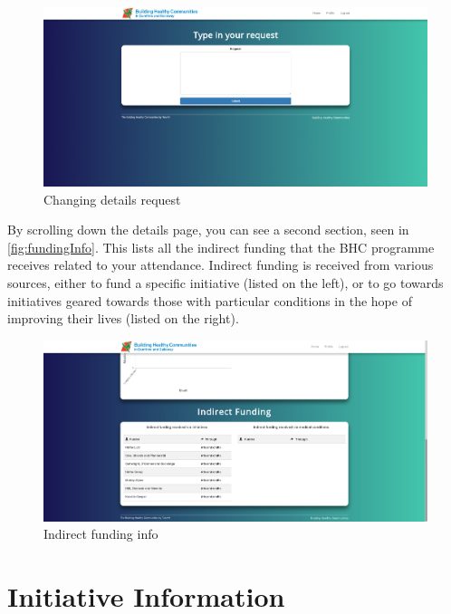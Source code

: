 \documentclass{bhcguides}
\begin{document}
\begin{figure}[h]
 \centerline{\includegraphics[width=\textwidth, height=\textheight, keepaspectratio]{detailchange.png}}
 \caption{Changing details request}
 \label{fig:detailChange}
\end{figure}

By scrolling down the details page, you can see a second section, seen in \autoref{fig:fundingInfo}. This lists all the indirect funding that the BHC programme receives related to your attendance. Indirect funding is received from various sources, either to fund a specific initiative (listed on the left), or to go towards initiatives geared towards those with particular conditions in the hope of improving their lives (listed on the right).

\begin{figure}[h]
 \centerline{\includegraphics[width=\textwidth, height=\textheight, keepaspectratio]{fundinginfo.png}}
 \caption{Indirect funding info}
 \label{fig:fundingInfo}
\end{figure}

\section{Initiative Information}
\label{sec:initiatives}
\end{document}
